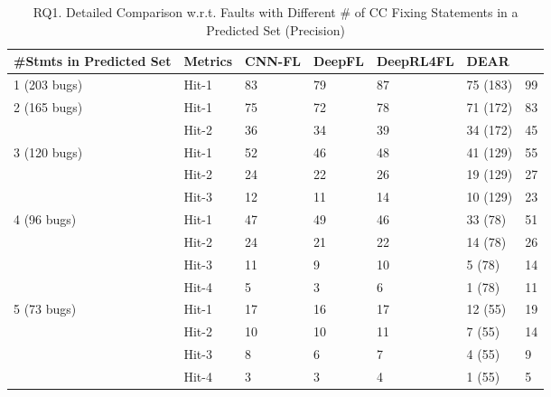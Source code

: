\begin{table}[t]
	\caption{RQ1. Detailed Comparison w.r.t. Faults with Different \# of CC Fixing Statements in a Predicted Set (Precision)}
\vspace{-10pt}
        \tabcolsep 2pt
	{\small
		\begin{center}
			\renewcommand{\arraystretch}{1}
			\begin{tabular}{p{1.5cm}<{\centering}|p{0.8cm}<{\centering}|p{1cm}<{\centering}|p{0.8cm}<{\centering}|p{1.2cm}<{\centering}|p{0.9cm}<{\centering}|p{1.3cm}<{\centering}}
				\hline
				\#Stmts in Predicted Set & Metrics & CNN-FL & DeepFL & DeepRL4FL & DEAR & \tool \\
				\hline
				\multirow{1}{*}{1 (203 bugs)}   & Hit-1  & 83 & 79 & 87 & 75 (183)& 99 \\
				\hline
				\multirow{2}{*}{2 (165 bugs)}  & Hit-1   & 75 & 72 & 78 & 71 (172) & 83 \\
				& Hit-2       						& 36 & 34 & 39 & 34 (172) & 45 \\
				\hline
				\multirow{3}{*}{3 (120 bugs)}  & Hit-1    & 52 & 46 & 48 & 41 (129) & 55 \\
				& Hit-2         					& 24 & 22 & 26 & 19 (129) & 27\\
				& Hit-3         				  	& 12 &11 & 14 & 10 (129) & 23 \\
				\hline
				\multirow{4}{*}{4 (96 bugs)}  & Hit-1    & 47 & 49 & 46 & 33 (78) & 51 \\
				& Hit-2        				    	 &24 & 21 & 22 & 14 (78) & 26 \\
				& Hit-3       					    & 11 & 9 & 10 & 5 (78) & 14 \\
				& Hit-4       					    & 5 & 3 & 6 & 1 (78) & 11 \\
				\hline 
				\multirow{5}{*}{5 (73 bugs)}  & Hit-1    & 17 & 16 & 17 & 12 (55) & 19 \\
				& Hit-2       						  & 10 & 10 & 11 & 7 (55) &14 \\
				& Hit-3       						  & 8 & 6 & 7 & 4 (55) &9 \\
				& Hit-4         					  & 3 & 3 & 4 & 1 (55) &5 \\

\end{tabular}
\end{center}}
\end{table}
